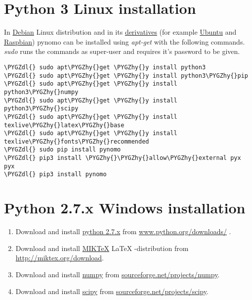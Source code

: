 \documentclass[a4paper,11pt,english]{sphinxmanual}
\def\PYGZdl{\char`\$}
\def\PYGZhy{\char`\-}
\begin{document}
\section{Python 3 Linux installation}
\label{installation/installation:python-3-linux-installation}
In \href{https://www.debian.org}{Debian}
Linux distribution and in its \href{https://en.wikipedia.org/wiki/List\_of\_Linux\_distributions}{derivatives} (for example \href{http://ubuntu.com/}{Ubuntu}  and \href{https://www.raspbian.org}{Raspbian}) pynomo can be installed using \emph{apt-get} with the following commands.
\emph{sudo} runs the commands as super-user and requires it's password to be given.

\begin{Verbatim}[commandchars=\\\{\},formatcom=\scriptsize]
\PYGZdl{} sudo apt\PYGZhy{}get \PYGZhy{}y install python3
\PYGZdl{} sudo apt\PYGZhy{}get \PYGZhy{}y install python3\PYGZhy{}pip
\PYGZdl{} sudo apt\PYGZhy{}get \PYGZhy{}y install python3\PYGZhy{}numpy
\PYGZdl{} sudo apt\PYGZhy{}get \PYGZhy{}y install python3\PYGZhy{}scipy
\PYGZdl{} sudo apt\PYGZhy{}get \PYGZhy{}y install texlive\PYGZhy{}latex\PYGZhy{}base
\PYGZdl{} sudo apt\PYGZhy{}get \PYGZhy{}y install texlive\PYGZhy{}fonts\PYGZhy{}recommended
\PYGZdl{} sudo pip install pynomo
\PYGZdl{} pip3 install \PYGZhy{}\PYGZhy{}allow\PYGZhy{}external pyx pyx
\PYGZdl{} pip3 install pynomo
\end{Verbatim}


\section{Python 2.7.x Windows installation}
\label{installation/installation:python-2-7-x-windows-installation}\begin{enumerate}
\item {} 
Download and install \href{https://www.python.org}{python 2.7.x} from \href{https://www.python.org/downloads/}{www.python.org/downloads/} .

\item {} 
Download and install \href{http://miktex.org}{MIKTeX} LaTeX -distribution from \href{http://miktex.org/download}{http://miktex.org/download}.

\item {} 
Download and install \href{http://www.numpy.org}{numpy} from \href{http://sourceforge.net/projects/numpy/files/latest/download?source=files}{sourceforge.net/projects/numpy}.

\item {} 
Download and install \href{http://www.scipy.org}{scipy} from \href{http://sourceforge.net/projects/scipy/files/latest/download?source=files}{sourceforge.net/projects/scipy}.

\end{enumerate}
\end{document}
